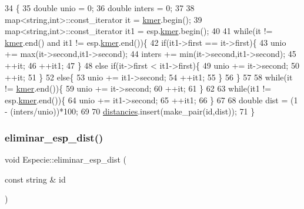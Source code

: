 \begin{DoxyCode}
34                                                            \{
35     \textcolor{keywordtype}{double} unio = 0;
36     \textcolor{keywordtype}{double} inters = 0;
37 
38     map<string,int>::const\_iterator it = \hyperlink{class_especie_ab6740db160f2d7335a98fa8d9f745cbe}{kmer}.begin();
39     map<string,int>::const\_iterator it1 = esp.\hyperlink{class_especie_ab6740db160f2d7335a98fa8d9f745cbe}{kmer}.begin();
40 
41     \textcolor{keywordflow}{while}(it != \hyperlink{class_especie_ab6740db160f2d7335a98fa8d9f745cbe}{kmer}.end() and it1 != esp.\hyperlink{class_especie_ab6740db160f2d7335a98fa8d9f745cbe}{kmer}.end())\{
42         \textcolor{keywordflow}{if}(it1->first == it->first)\{
43             unio += max(it->second,it1->second);
44             inters += min(it->second,it1->second);
45             ++it;
46             ++it1;
47         \}
48         \textcolor{keywordflow}{else} \textcolor{keywordflow}{if}(it->first < it1->first)\{
49             unio += it->second;
50             ++it;
51         \}
52         \textcolor{keywordflow}{else}\{
53             unio += it1->second;
54             ++it1;
55         \}
56     \}
57 
58     \textcolor{keywordflow}{while}(it != \hyperlink{class_especie_ab6740db160f2d7335a98fa8d9f745cbe}{kmer}.end())\{
59         unio += it->second;
60         ++it;
61     \}
62 
63     \textcolor{keywordflow}{while}(it1 != esp.\hyperlink{class_especie_ab6740db160f2d7335a98fa8d9f745cbe}{kmer}.end())\{
64         unio += it1->second;
65         ++it1;
66     \}
67 
68     \textcolor{keywordtype}{double} dist = (1 - (inters/unio))*100;
69 
70     \hyperlink{class_especie_ad4bbf9359ebc17c3c7f501bc31c86509}{distancies}.insert(make\_pair(\textcolor{keywordtype}{id},dist));
71 \}
\end{DoxyCode}
\mbox{\label{class_especie_a2a63fa33f9297beec7b57a86fe55ce2a}} 
\subsubsection{\texorpdfstring{eliminar\+\_\+esp\+\_\+dist()}{eliminar\_esp\_dist()}}
{\footnotesize\ttfamily void Especie\+::eliminar\+\_\+esp\+\_\+dist (\begin{DoxyParamCaption}\item[{const string \&}]{id }\end{DoxyParamCaption})}




